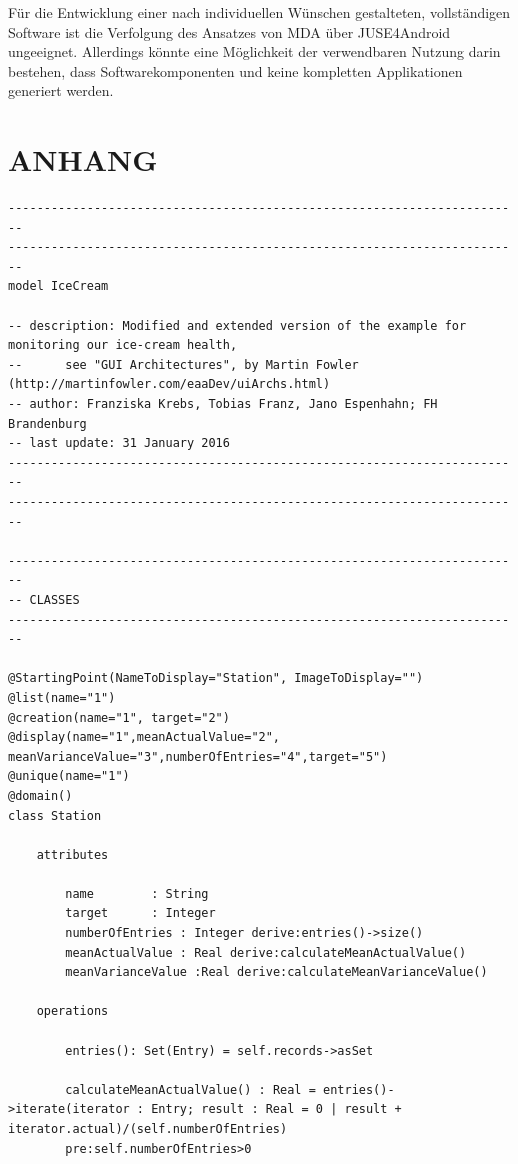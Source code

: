 \documentclass[a4paper,twoside]{article}
\begin{document}
Für die Entwicklung einer nach individuellen Wünschen gestalteten, vollständigen Software ist die Verfolgung des Ansatzes von MDA über JUSE4Android ungeeignet. Allerdings könnte eine Möglichkeit der verwendbaren Nutzung darin bestehen, dass Softwarekomponenten und keine kompletten Applikationen generiert werden.

\vfill

{\small
}
\newpage
\onecolumn
\section*{\uppercase{Anhang}}
\begin{lstlisting}[caption={Vollständige USE-Spezifikation des IceCream Modells},label=lst:completeUSE]
------------------------------------------------------------------------
------------------------------------------------------------------------
model IceCream

-- description: Modified and extended version of the example for monitoring our ice-cream health,
-- 		see "GUI Architectures", by Martin Fowler (http://martinfowler.com/eaaDev/uiArchs.html)
-- author: Franziska Krebs, Tobias Franz, Jano Espenhahn; FH Brandenburg
-- last update: 31 January 2016
------------------------------------------------------------------------
------------------------------------------------------------------------

------------------------------------------------------------------------
-- CLASSES
------------------------------------------------------------------------

@StartingPoint(NameToDisplay="Station", ImageToDisplay="")
@list(name="1")
@creation(name="1", target="2")
@display(name="1",meanActualValue="2", meanVarianceValue="3",numberOfEntries="4",target="5")
@unique(name="1")
@domain()
class Station

	attributes

		name		: String
		target		: Integer
		numberOfEntries : Integer derive:entries()->size()
		meanActualValue : Real derive:calculateMeanActualValue()
		meanVarianceValue :Real derive:calculateMeanVarianceValue()
		
	operations
	
		entries(): Set(Entry) = self.records->asSet
	  
		calculateMeanActualValue() : Real = entries()->iterate(iterator : Entry; result : Real = 0 | result + iterator.actual)/(self.numberOfEntries) 
		pre:self.numberOfEntries>0


\end{lstlisting}
\end{document}
